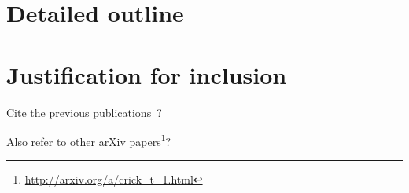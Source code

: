 \documentclass[a4paper,11pt]{article}
\begin{document}
\section*{Detailed outline}

\section*{Justification for inclusion}

Cite the previous
publications~\cite{crick-et-al_wssspe2,crick-et-al_recomp2014,crick-et-al_jors,crick-et-al_cse2015}?

Also refer to other arXiv papers\footnote{\url{http://arxiv.org/a/crick_t_1.html}}?




\end{document}
